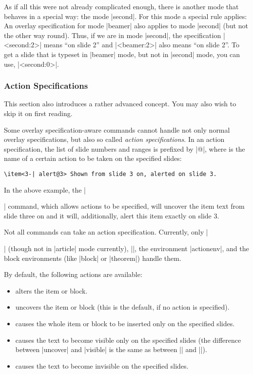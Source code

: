 \begin{original...}
As if all this were not already complicated enough, there is another mode that behaves in a special way: the mode |second|. For this mode a special rule applies: An overlay specification for mode |beamer| also applies to mode |second| (but not the other way round). Thus, if we are in mode |second|, the specification |<second:2>| means ``on slide 2'' and |<beamer:2>| also means ``on slide 2''. To get a slide that is typeset in |beamer| mode, but not in |second| mode, you can use, |<second:0>|.

\subsubsection{Action Specifications}
\label{section-action-specifications}

This section also introduces a rather advanced concept. You may also wish to skip it on first reading.

Some overlay specification-aware commands cannot handle not only normal overlay specifications, but also so called \emph{action specifications}. In an action specification, the list of slide numbers and ranges is prefixed by |@|, where  is the name of a certain action to be taken on the specified slides:
\begin{verbatim}
\item<3-| alert@3> Shown from slide 3 on, alerted on slide 3.
\end{verbatim}

In the above example, the |\item| command, which allows actions to be specified, will uncover the item text from slide three on and it will, additionally, alert this item exactly on slide 3.

Not all commands can take an action specification. Currently, only |\item| (though not in |article| mode currently), |\action|, the environment |actionenv|, and the block environments (like |block| or |theorem|) handle them.

By default, the following actions are available:
\begin{itemize}
\item {} alters the item or block.
\item {} uncovers the item or block (this is the default, if no action is specified).
\item {} causes the whole item or block to be inserted only on the specified slides.
\item {} causes the text to become visible only on the specified slides (the difference between |uncover| and |visible| is the same as between |\uncover| and |\visible|).
\item {} causes the text to become invisible on the specified slides.
\end{itemize}


\end{original...}
